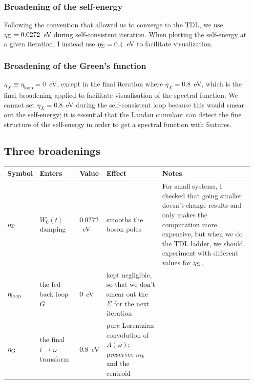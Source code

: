 \subsubsection{Broadening of the self-energy}
Following the convention that allowed us to converge to the TDL, we use $\eta_{\Sigma} = 0.0272$~eV during self-consistent iteration. When plotting the self-energy at a given iteration, I instead use $\eta_{\Sigma}=0.4$~eV to facilitate visualization.
\subsubsection{Broadening of the Green's function}
$\eta_X\equiv\eta_{\text{loop}}=0$~eV, except in the final iteration where $\eta_X = 0.8$~eV, which is the final broadening applied to facilitate visualisation of the spectral function. We cannot set $\eta_X = 0.8$~eV during the self-consistent loop because this would smear out the self-energy; it is essential that the Landau cumulant can detect the fine structure of the self-energy in order to get a spectral function with features.


\subsection{Three broadenings}

\begin{center}
\small
\setlength{\extrarowheight}{2pt}
\begin{tabular}{@{}l
                 >{\raggedright\arraybackslash}p{2.3cm}
                 l
                 >{\raggedright\arraybackslash}p{3.1cm}
                 >{\raggedright\arraybackslash}p{5.2cm}@{}}
\toprule
Symbol & Enters & Value & Effect & Notes \\
\midrule
$\eta_{\Sigma}$ & $W_0(t)$ damping & $0.0272$~eV
  & smooths the boson poles
  & {For small systems, I checked that going smaller doesn't change results and only makes the
    computation more expensive, but when we do the TDL ladder, we should
    experiment with different values for $\eta_{\Sigma}$.} \\
\addlinespace
$\eta_{\mathrm{loop}}$ & the fed-back loop $G$ & $0$~eV
  & kept negligible, so that we don't smear out the $\Sigma$ for the next iteration
  & \\
\addlinespace
$\eta_{\mathrm{G}}$ & the final $t\!\to\!\omega$ transform & $0.8$~eV
  & pure Lorentzian convolution of $A(\omega)$; preserves $m_0$ and the centroid
  & \\
\bottomrule
\end{tabular}
\end{center}

